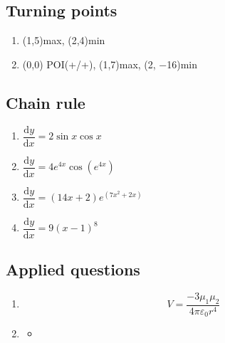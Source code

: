 \documentclass[
]{book}
\providecommand{\tightlist}{%
  \setlength{\itemsep}{0pt}\setlength{\parskip}{0pt}}
\begin{document}
\hypertarget{turning-points-1}{%
\subsection{Turning points}\label{turning-points-1}}

\begin{enumerate}
\def\labelenumi{\arabic{enumi}.}
\tightlist
\item
  (1,5)max, (2,4)min
\item
  (0,0) POI(+/+), (1,7)max, (2, −16)min
\end{enumerate}

\hypertarget{chain-rule-1}{%
\subsection{Chain rule}\label{chain-rule-1}}

\begin{enumerate}
\def\labelenumi{\arabic{enumi}.}
\tightlist
\item
  \(\dfrac{\textrm{d}y}{\textrm{d}x}= 2 \sin x \cos x\)
\item
  \(\dfrac{\textrm{d}y}{\textrm{d}x}=4e^{4x}\cos (e^{4x})\)
\item
  \(\dfrac{\textrm{d}y}{\textrm{d}x}= (14x+2)e^{(7x^2 + 2x)}\)
\item
  \(\dfrac{\textrm{d}y}{\textrm{d}x}= 9 (x-1)^8\)
\end{enumerate}

\hypertarget{applied-questions-1}{%
\subsection{Applied questions}\label{applied-questions-1}}

\begin{enumerate}
\def\labelenumi{\arabic{enumi}.}
\item
  \begin{equation*}
  V = \frac{-3 \mu_1 \mu_2}{4 \pi \varepsilon_0 r^4}
  \end{equation*}
\item
  \begin{itemize}
  \item
  \end{itemize}
\end{enumerate}
\end{document}
